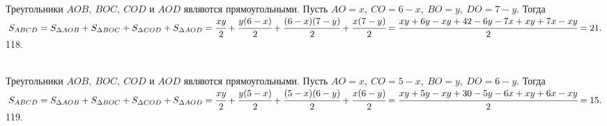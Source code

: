 \documentclass[12pt]{article}
\begin{document}
Треугольники $AOB,\ BOC,\ COD$ и $AOD$ являются прямоугольными. Пусть $AO=x,\ CO=6-x,\ BO=y,\ DO=7-y.$ Тогда $S_{ABCD}=S_{\Delta AOB}+S_{\Delta BOC}+S_{\Delta COD}+S_{\Delta AOD}=\cfrac{xy}{2}+\cfrac{y(6-x)}{2}+\cfrac{(6-x)(7-y)}{2}+\cfrac{x(7-y)}{2}=\cfrac{xy+6y-xy+42-6y-7x+xy+7x-xy}{2}=21.$\\
118. \begin{figure}[ht!]
\end{figure}\\
Треугольники $AOB,\ BOC,\ COD$ и $AOD$ являются прямоугольными. Пусть $AO=x,\ CO=5-x,\ BO=y,\ DO=6-y.$ Тогда $S_{ABCD}=S_{\Delta AOB}+S_{\Delta BOC}+S_{\Delta COD}+S_{\Delta AOD}=\cfrac{xy}{2}+\cfrac{y(5-x)}{2}+\cfrac{(5-x)(6-y)}{2}+\cfrac{x(6-y)}{2}=\cfrac{xy+5y-xy+30-5y-6x+xy+6x-xy}{2}=15.$\\
119. \begin{figure}[ht!]
\end{figure}\\
\end{document}
